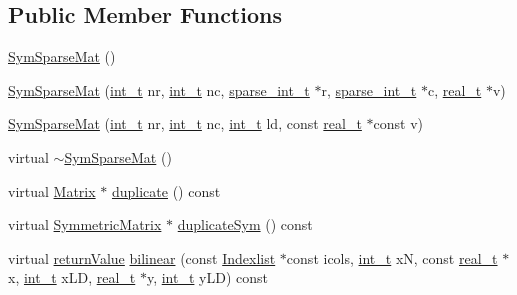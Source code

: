 \subsection*{Public Member Functions}
\begin{DoxyCompactItemize}
\item 
\hyperlink{class_sym_sparse_mat_a8063b880d4656db6e956c0b73259a00d}{Sym\+Sparse\+Mat} ()
\item 
\hyperlink{class_sym_sparse_mat_ad8e4399253ee8d7295482fb4c647918c}{Sym\+Sparse\+Mat} (\hyperlink{_types_8hpp_ab6fd6105e64ed14a0c9281326f05e623}{int\+\_\+t} nr, \hyperlink{_types_8hpp_ab6fd6105e64ed14a0c9281326f05e623}{int\+\_\+t} nc, \hyperlink{_types_8hpp_aa5432b00c9081e2d62d7f38c32e4ed80}{sparse\+\_\+int\+\_\+t} $\ast$r, \hyperlink{_types_8hpp_aa5432b00c9081e2d62d7f38c32e4ed80}{sparse\+\_\+int\+\_\+t} $\ast$c, \hyperlink{qp_o_a_s_e_s__wrapper_8h_a0d00e2b3dfadee81331bbb39068570c4}{real\+\_\+t} $\ast$v)
\item 
\hyperlink{class_sym_sparse_mat_a13a38db0a6c1ad34e585ac0917427c9a}{Sym\+Sparse\+Mat} (\hyperlink{_types_8hpp_ab6fd6105e64ed14a0c9281326f05e623}{int\+\_\+t} nr, \hyperlink{_types_8hpp_ab6fd6105e64ed14a0c9281326f05e623}{int\+\_\+t} nc, \hyperlink{_types_8hpp_ab6fd6105e64ed14a0c9281326f05e623}{int\+\_\+t} ld, const \hyperlink{qp_o_a_s_e_s__wrapper_8h_a0d00e2b3dfadee81331bbb39068570c4}{real\+\_\+t} $\ast$const v)
\item 
virtual \hyperlink{class_sym_sparse_mat_ab76354faf12ae02edab32daa932868c6}{$\sim$\+Sym\+Sparse\+Mat} ()
\item 
virtual \hyperlink{class_matrix}{Matrix} $\ast$ \hyperlink{class_sym_sparse_mat_a3538621d1eadb47a97e7299cf87c0e66}{duplicate} () const
\item 
virtual \hyperlink{class_symmetric_matrix}{Symmetric\+Matrix} $\ast$ \hyperlink{class_sym_sparse_mat_a624d9155d154c2f72fdccb697d14f62a}{duplicate\+Sym} () const
\item 
virtual \hyperlink{_message_handling_8hpp_a81d556f613bfbabd0b1f9488c0fa865e}{return\+Value} \hyperlink{class_sym_sparse_mat_a6ab57773ce04846432f4f0c4d3846450}{bilinear} (const \hyperlink{class_indexlist}{Indexlist} $\ast$const icols, \hyperlink{_types_8hpp_ab6fd6105e64ed14a0c9281326f05e623}{int\+\_\+t} xN, const \hyperlink{qp_o_a_s_e_s__wrapper_8h_a0d00e2b3dfadee81331bbb39068570c4}{real\+\_\+t} $\ast$x, \hyperlink{_types_8hpp_ab6fd6105e64ed14a0c9281326f05e623}{int\+\_\+t} x\+LD, \hyperlink{qp_o_a_s_e_s__wrapper_8h_a0d00e2b3dfadee81331bbb39068570c4}{real\+\_\+t} $\ast$y, \hyperlink{_types_8hpp_ab6fd6105e64ed14a0c9281326f05e623}{int\+\_\+t} y\+LD) const
\end{DoxyCompactItemize}
